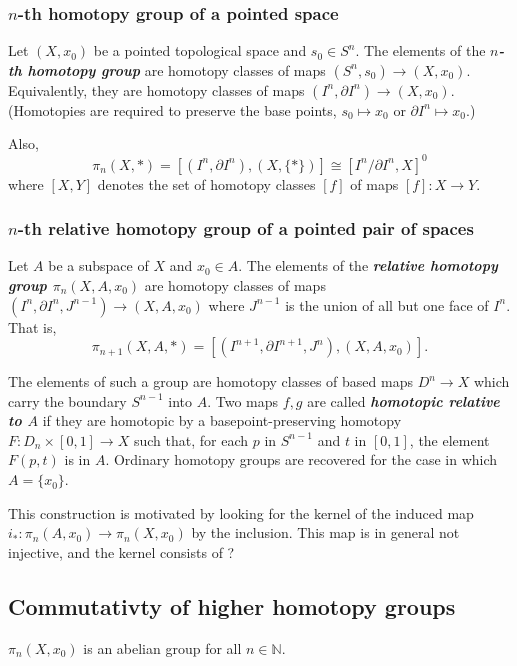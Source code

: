 \subsubsection*{\texorpdfstring{$n$}{n}-th homotopy group of a pointed space}

\begin{defn}
	Let $(X,x_0)$ be a pointed topological space and $s_0\in S^n$. The elements of the \textbf{\textit{$n$-th homotopy group}} are homotopy classes of maps $(S^n,s_0)\to (X,x_0)$. Equivalently, they are homotopy classes of maps $(I^n,\partial I^n)\to (X,x_0)$. (Homotopies are required to preserve the base points, $s_0\mapsto x_0$ or $\partial I^n\mapsto x_0$.)
		
	Also,
	\[\pi_n(X,*)=[(I^n,\partial I^n),(X,\{*\})]\cong[I^n/\partial I^n,X]^0\]
	where $[X,Y]$ denotes the set of homotopy classes $[f]$ of maps $[f]:X\to Y$.
\end{defn}

\subsubsection{\texorpdfstring{$n$}{n}-th relative homotopy group of a pointed pair of spaces}
Let $A$ be a subspace of $X$ and $x_0\in A$. The elements of the \textbf{\textit{relative homotopy group $\pi_n(X,A,x_0)$}} are homotopy classes of maps $(I^n,\partial I^n,J^{n-1})\to (X,A,x_0)$ where $J^{n-1}$ is the union of all but one face of $I^n$. That is,
		\[\pi_{n+1}(X,A,*)=[(I^{n+1},\partial I^{n+1},J^n),(X,A,x_0)].\]
		
		The elements of such a group are homotopy classes of based maps $D^n\to X$ which carry the boundary $S^{n-1}$ into $A$. Two maps $f,g$ are called \textbf{\textit{homotopic relative to $A$}} if they are homotopic by a basepoint-preserving homotopy $F:D_n\times[0,1]\to X$ such that, for each $p$ in $S^{n-1}$ and $t$ in $[0,1]$, the element $F(p,t)$ is in $A$. Ordinary homotopy groups are recovered for the case in which $A=\{x_0\}$.
\begin{remark}
	This construction is motivated by looking for the kernel of the induced map $i_*:\pi_n(A,x_0)\to\pi_n(X,x_0)$ by the inclusion. This map is in general not injective, and the kernel consists of ?
\end{remark}

\subsection*{Commutativty of higher homotopy groups}
\begin{prop}
	$\pi_n(X,x_0)$ is an abelian group for all $n\in\mathbb{N}$.
\end{prop}

